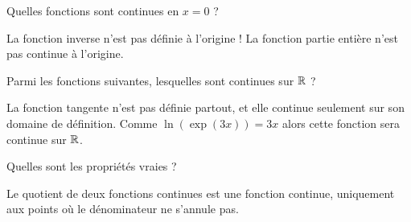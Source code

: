 \begin{question}

Quelles fonctions sont continues en $x=0$ ?
\begin{answers}



\end{answers}
\begin{explanations}
La fonction inverse n'est pas définie à l'origine !
La fonction partie entière n'est pas continue à l'origine.
\end{explanations}
\end{question}


\begin{question}

Parmi les fonctions suivantes, lesquelles sont continues sur $\mathbb{R}$ ?
\begin{answers}



\end{answers}
\begin{explanations}
La fonction tangente n'est pas définie partout, et elle continue seulement sur son domaine de définition. 
Comme $\ln(\exp(3x)) = 3x$ alors cette fonction sera continue sur $\mathbb{R}$.
\end{explanations}
\end{question}


\begin{question}

Quelles sont les propriétés vraies ?
\begin{answers}



\end{answers}
\begin{explanations}
Le quotient de deux fonctions continues est une fonction continue, uniquement aux points où le dénominateur ne s'annule pas.
\end{explanations}
\end{question}


